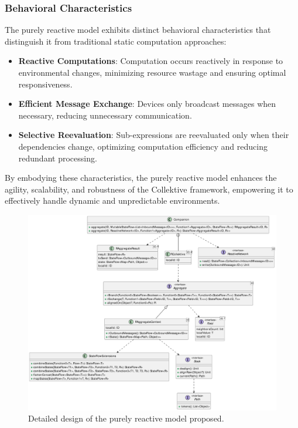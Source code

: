 \subsubsection{Behavioral Characteristics}

The purely reactive model exhibits distinct behavioral characteristics that distinguish it from traditional static computation approaches:

\begin{itemize}
    \item \textbf{Reactive Computations}: Computation occurs reactively in response to environmental changes, minimizing resource wastage and ensuring optimal responsiveness.
    \item \textbf{Efficient Message Exchange}: Devices only broadcast messages when necessary, reducing unnecessary communication.
    \item \textbf{Selective Reevaluation}: Sub-expressions are reevaluated only when their dependencies change, optimizing computation efficiency and reducing redundant processing.
\end{itemize}

By embodying these characteristics, the purely reactive model enhances the agility, scalability, and robustness of the Collektive framework, empowering it to effectively handle dynamic and unpredictable environments.

\begin{figure}
    \centering
    \includegraphics[width=\linewidth]{figures/collektive-prm-design.pdf}
    \caption{Detailed design of the purely reactive model proposed.}
    \label{fig:collektive-prm-design}
\end{figure}

